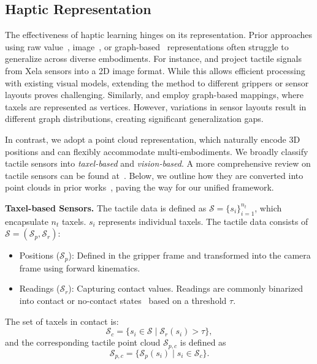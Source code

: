 \documentclass[11pt, a4paper, logo, twocolumn]{brown}
\begin{document}
\subsection{Haptic Representation}
\label{sec: haptic-representation}

The effectiveness of haptic learning hinges on its representation.
Prior approaches using raw value~\cite{lin_learning_2024}, image~\cite{guzey_dexterity_2023}, or graph-based~\cite{yang_tacgnn_2023, li_hypertaxel_2024, rezazadeh_hierarchical_2023} representations often struggle to generalize across diverse embodiments.
For instance, \citet{wu_tactile_2022} and \citet{guzey_dexterity_2023} project tactile signals from Xela sensors into a 2D image format. 
While this allows efficient processing with existing visual models, extending the method to different grippers or sensor layouts proves challenging.
Similarly, \citet{li_hypertaxel_2024} and \citet{rezazadeh_hierarchical_2023} employ graph-based mappings, where taxels are represented as vertices. 
However, variations in sensor layouts result in different graph distributions, creating significant generalization gaps.

In contrast, we adopt a point cloud representation, which naturally encode 3D positions and can flexibly accommodate multi-embodiments.
We broadly classify tactile sensors into \emph{taxel-based} and \emph{vision-based}.
A more comprehensive review on tactile sensors can be found at~\cite{yamaguchi_recent_2019}.
Below, we outline how they are converted into point clouds in prior works~\cite{dikhale_visuotactile_2022, suresh_neuralfeels_2024, watkins-valls_multi-modal_2019, falco_cross-modal_2017}, paving the way for our unified framework. 

\textbf{Taxel-based Sensors.} 
The tactile data is defined as $\mathcal{S} = \{ s_i \}_{i=1}^{n_t}$, which encapsulate $n_t$ taxels.
$s_i$ represents individual taxels.
The tactile data consists of $\mathcal{S} = (\mathcal{S}_p, \mathcal{S}_r)$: 
\begin{itemize}
    \item Positions ($\mathcal{S}_p$): Defined in the gripper frame and transformed into the camera frame using forward kinematics.
    \item Readings ($\mathcal{S}_r$): Capturing contact values. Readings are commonly binarized into contact or no-contact states~\cite{yin_rotating_2023, xue_arraybot_2023, li_vihope_2023, dikhale_visuotactile_2022} based on a threshold $\tau$.
\end{itemize}
The set of taxels in contact is:
\begin{equation}
    \mathcal{S}_c = \{ s_i \in \mathcal{S} \mid \mathcal{S}_r(s_i) > \tau \},
\end{equation}
and the corresponding tactile point cloud $\mathcal{S}_{p, c}$ is defined as 
\begin{equation}
    \mathcal{S}_{p, c} = \{ \mathcal{S}_p(s_i) \mid s_i \in \mathcal{S}_c \}.
\end{equation}
\end{document}
